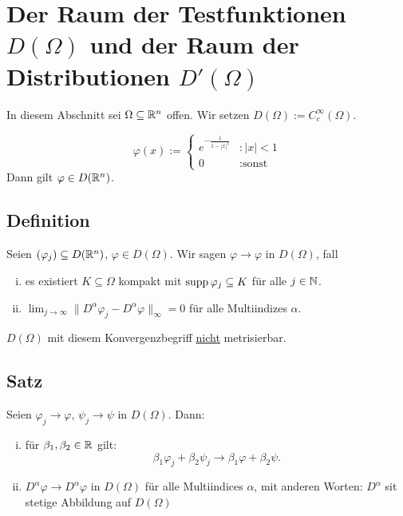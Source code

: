 \section{Der Raum der Testfunktionen $D(\Omega)$ und der Raum der Distributionen $D'(\Omega)$}

In diesem Abschnitt sei $\Omega \subseteq \mathbb{R}^n$ offen.
Wir setzen $D(\Omega) := C_c^\infty(\Omega)$.

\begin{ex}
  $$
  \varphi(x) := \begin{cases} e^{-\frac{1}{1 - |x|^2}} &\colon |x| < 1 \\
    0 &\colon \text{sonst}
  \end{cases} 
  $$
  Dann gilt $\varphi \in D(\mathbb{R}^n)$.
\end{ex}

\subsection{Definition}
Seien $(\varphi_j) \subseteq D(\mathbb{R}^n)$, $\varphi \in D(\Omega)$.
Wir sagen $\varphi \to \varphi$ in $D(\Omega)$, fall
\begin{enumerate}[i)]
  \item es existiert $K \subseteq \Omega$ kompakt mit $\operatorname{supp} \varphi_j \subseteq K$ für alle $j \in \mathbb{N}$.
  \item $\lim_{j \to \infty} \| D^\alpha \varphi_j - D^\alpha \varphi \|_{\infty} = 0$ für alle Multiindizes $\alpha$.
\end{enumerate}


\begin{bem}
  $D(\Omega)$ mit diesem Konvergenzbegriff \underline{nicht} metrisierbar. 
\end{bem}

\subsection{Satz}
  Seien $\varphi_j \to \varphi$, $\psi_j \to \psi$ in $D(\Omega)$. Dann:
  \begin{enumerate}[i)]
  \item für $\beta_1, \beta_2 \in \mathbb{R}$ gilt: 
    $$\beta_1 \varphi_j + \beta_2 \psi_j 
    \to \beta_1 \varphi + \beta_2 \psi.
    $$
  \item $D^\alpha \varphi \to D^\alpha \varphi$ in $D(\Omega)$ für alle Multiindices $\alpha$, mit anderen Worten: $D^\alpha$ sit stetige Abbildung auf $D(\Omega)$
  \end{enumerate}

